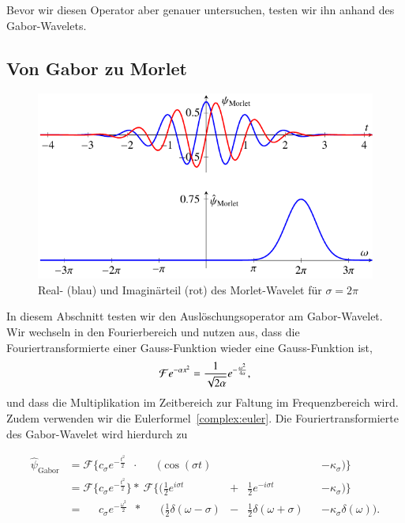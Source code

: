 Bevor wir diesen Operator aber genauer untersuchen, testen wir ihn anhand des Gabor-Wavelets.

\subsection{Von Gabor zu Morlet}
\label{complex:gabor-to-morlet}

\begin{figure}
	\centering
	\includegraphics{papers/complex/images/morlet.pdf}
	\caption{Real- (blau) und Imaginärteil (rot) des Morlet-Wavelet für $\sigma = 2\pi$ \label{complex:morlet}}
\end{figure}

In diesem Abschnitt testen wir den Auslöschungsoperator am Gabor-Wavelet.
Wir wechseln in den Fourierbereich und nutzen aus, dass die Fouriertransformierte einer Gauss-Funktion wieder eine Gauss-Funktion ist,
\[
	\Four e^{-\alpha x^2} 
	= \frac{1}{\sqrt{2\alpha}}e^{- \frac{\omega^2}{4\alpha}},
\]
und dass die Multiplikation im Zeitbereich zur Faltung im Frequenzbereich wird.
Zudem verwenden wir die Eulerformel~\eqref{complex:euler}.
Die Fouriertransformierte des Gabor-Wavelet wird hierdurch zu

\begin{equation*}
\begin{aligned}
 \hat{\psi}_\text{Gabor}
 & = \mathcal{F}\Bigg\lbrace c_\sigma e^{-\frac{t^2}{2}}\phantom{\Bigg\rbrace}
 \cdot\; \phantom{\mathcal{F}\Bigg\lbrace}
 \Bigg(\cos\left(\sigma t\right) &&
 &&- \kappa_\sigma\Bigg) \Bigg\rbrace \\
 & = \mathcal{F}\Bigg\lbrace c_\sigma e^{-\frac{t^2}{2}} \Bigg\rbrace 
 *\: \mathcal{F}\Bigg\lbrace\Bigg( \frac12 e^{i\sigma t} &+& \frac12 e^{-i\sigma t}
 &&- \kappa_\sigma \Bigg)\Bigg\rbrace\\
 & = \phantom{\mathcal{F}\Bigg\lbrace} c_\sigma e^{- \frac{\omega^2}{2}} \phantom{\Big\rbrace}
 *\:\phantom{\mathcal{F}\Bigg\lbrace} \Bigg(
  \frac{1}{2}\delta(\omega - \sigma) &-&
  \frac{1}{2}\delta(\omega + \sigma) 
 && - \kappa_\sigma\delta(\omega)
  \Bigg).
\end{aligned}
\end{equation*}

